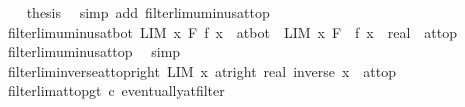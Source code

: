 \begin{isabellebody}
\ \ \isamarkupfalse%
\ {\isacharquery}{\kern0pt}thesis\ \isamarkupfalse%
\ {\isacharparenleft}{\kern0pt}simp\ add{\isacharcolon}{\kern0pt}\ filterlim{\isacharunderscore}{\kern0pt}uminus{\isacharunderscore}{\kern0pt}at{\isacharunderscore}{\kern0pt}top{\isacharparenright}{\kern0pt}\isanewline
{}\isamarkupfalse%
%
\endisatagproof
{\isafoldproof}%
%
\isadelimproof
\isanewline
%
\endisadelimproof
\isanewline
{}\isamarkupfalse%
\ filterlim{\isacharunderscore}{\kern0pt}uminus{\isacharunderscore}{\kern0pt}at{\isacharunderscore}{\kern0pt}bot{\isacharcolon}{\kern0pt}\ {\isachardoublequoteopen}{\isacharparenleft}{\kern0pt}LIM\ x\ F{\isachardot}{\kern0pt}\ f\ x\ {\isacharcolon}{\kern0pt}{\isachargreater}{\kern0pt}\ at{\isacharunderscore}{\kern0pt}bot{\isacharparenright}{\kern0pt}\ {\isasymlongleftrightarrow}\ {\isacharparenleft}{\kern0pt}LIM\ x\ F{\isachardot}{\kern0pt}\ {\isacharminus}{\kern0pt}\ {\isacharparenleft}{\kern0pt}f\ x{\isacharparenright}{\kern0pt}\ {\isacharcolon}{\kern0pt}{\isacharcolon}{\kern0pt}\ real\ {\isacharcolon}{\kern0pt}{\isachargreater}{\kern0pt}\ at{\isacharunderscore}{\kern0pt}top{\isacharparenright}{\kern0pt}{\isachardoublequoteclose}\isanewline
%
\isadelimproof
\ \ %
\endisadelimproof
%
\isatagproof
{}\isamarkupfalse%
\ filterlim{\isacharunderscore}{\kern0pt}uminus{\isacharunderscore}{\kern0pt}at{\isacharunderscore}{\kern0pt}top\ \isamarkupfalse%
\ simp%
\endisatagproof
{\isafoldproof}%
%
\isadelimproof
\isanewline
%
\endisadelimproof
\isanewline
{}\isamarkupfalse%
\ filterlim{\isacharunderscore}{\kern0pt}inverse{\isacharunderscore}{\kern0pt}at{\isacharunderscore}{\kern0pt}top{\isacharunderscore}{\kern0pt}right{\isacharcolon}{\kern0pt}\ {\isachardoublequoteopen}LIM\ x\ at{\isacharunderscore}{\kern0pt}right\ {\isacharparenleft}{\kern0pt}{}{\isacharcolon}{\kern0pt}{\isacharcolon}{\kern0pt}real{\isacharparenright}{\kern0pt}{\isachardot}{\kern0pt}\ inverse\ x\ {\isacharcolon}{\kern0pt}{\isachargreater}{\kern0pt}\ at{\isacharunderscore}{\kern0pt}top{\isachardoublequoteclose}\isanewline
%
\isadelimproof
\ \ %
\endisadelimproof
%
\isatagproof
{}\isamarkupfalse%
\ filterlim{\isacharunderscore}{\kern0pt}at{\isacharunderscore}{\kern0pt}top{\isacharunderscore}{\kern0pt}gt{\isacharbrackleft}{\kern0pt}\ c{\isacharequal}{\kern0pt}{}{\isacharbrackright}{\kern0pt}\ eventually{\isacharunderscore}{\kern0pt}at{\isacharunderscore}{\kern0pt}filter\isanewline
{}\isamarkupfalse%

\end{isabellebody}
